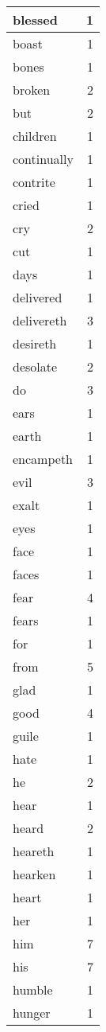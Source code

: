 \begin{center}
\begin{longtable}{l|r}
blessed & 1 \\ \hline
boast & 1 \\ \hline
bones & 1 \\ \hline
broken & 2 \\ \hline
but & 2 \\ \hline
children & 1 \\ \hline
continually & 1 \\ \hline
contrite & 1 \\ \hline
cried & 1 \\ \hline
cry & 2 \\ \hline
cut & 1 \\ \hline
days & 1 \\ \hline
delivered & 1 \\ \hline
delivereth & 3 \\ \hline
desireth & 1 \\ \hline
desolate & 2 \\ \hline
do & 3 \\ \hline
ears & 1 \\ \hline
earth & 1 \\ \hline
encampeth & 1 \\ \hline
evil & 3 \\ \hline
exalt & 1 \\ \hline
eyes & 1 \\ \hline
face & 1 \\ \hline
faces & 1 \\ \hline
fear & 4 \\ \hline
fears & 1 \\ \hline
for & 1 \\ \hline
from & 5 \\ \hline
glad & 1 \\ \hline
good & 4 \\ \hline
guile & 1 \\ \hline
hate & 1 \\ \hline
he & 2 \\ \hline
hear & 1 \\ \hline
heard & 2 \\ \hline
heareth & 1 \\ \hline
hearken & 1 \\ \hline
heart & 1 \\ \hline
her & 1 \\ \hline
him & 7 \\ \hline
his & 7 \\ \hline
humble & 1 \\ \hline
hunger & 1 \\ \hline

\end{longtable}
\end{center}
